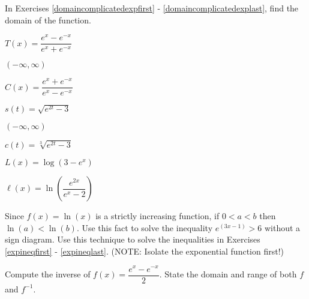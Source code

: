 \documentclass{ximera}
\begin{document}
\begin{question}
In Exercises \ref{domaincomplicatedexpfirst} - \ref{domaincomplicatedexplast},  find the domain of the function.

\begin{problem}\label{domaincomplicatedexpfirst}
$T(x) = \dfrac{e^{x} - e^{-x}}{e^{x} + e^{-x}}$

\begin{solution}
$(-\infty, \infty)$ 
\end{solution}
\end{problem}      

\begin{problem}
$C(x) = \dfrac{e^{x}  + e^{-x}}{e^{x}  - e^{-x}}$
\end{problem}   

\begin{problem}
$s(t) = \sqrt{e^{2t} - 3}$

\begin{solution}
$(-\infty, \infty)$ 
\end{solution}
\end{problem}      

\begin{problem}
$c(t) = \sqrt[3]{e^{2t} - 3}$
\end{problem}      

\begin{problem}
$L(x) = \log\left( 3 - e^{x} \right)$
\end{problem}     

\begin{problem}\label{domaincomplicatedexplast}
$\ell(x) = \ln\left( \dfrac{e^{2x}}{e^{x}-2} \right)$ 
\end{problem} 

    
\end{question}

\begin{problem}\label{onetoonelogexercise} 
Since $f(x) = \ln(x)$ is a strictly increasing function, if $0 < a < b$ then $\ln(a) < \ln(b)$.  Use this fact to solve the inequality $e^{(3x - 1)} > 6$ without a sign diagram. Use this technique to solve the inequalities in Exercises \ref{expineqfirst} - \ref{expineqlast}. (NOTE:  Isolate the exponential function first!)
\end{problem}

\begin{problem}\label{hyperbolicsine} 
Compute the inverse of $f(x) = \dfrac{e^{x} - e^{-x}}{2}$.  State the domain and range of both $f$ and $f^{-1}$. 
\end{problem}
\end{document}
